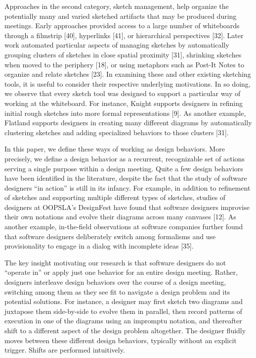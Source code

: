 Approaches in the second category, sketch management, help organize the potentially many and varied sketched artifacts that may be produced during meetings. Early approaches provided access to a large number of whiteboards through a filmstrip [40], hyperlinks [41], or hierarchical perspectives [32]. Later work automated particular aspects of managing sketches by automatically grouping clusters of sketches in close spatial proximity [31], shrinking sketches when moved to the periphery [18], or using metaphors such as Post-It Notes to organize and relate sketches [23].  
In examining these and other existing sketching tools, it is useful to consider their respective underlying motivations. In so doing, we observe that every sketch tool was designed to support a particular way of working at the whiteboard. For instance, Knight supports designers in refining initial rough sketches into more formal representations [9]. As another example, Flatland supports designers in creating many different diagrams by automatically clustering sketches and adding specialized behaviors to those clusters [31].

In this paper, we define these ways of working as design behaviors. More precisely, we define a design behavior as a recurrent, recognizable set of actions serving a single purpose within a design meeting. Quite a few design behaviors have been identified in the literature, despite the fact that the study of software designers “in action” is still in its infancy. For example, in addition to refinement of sketches and supporting multiple different types of sketches, studies of designers at OOPSLA’s DesignFest have found that software designers improvise their own notations and evolve their diagrams across many canvases [12]. As another example, in-the-field observations at software companies further found that software designers deliberately switch among formalisms and use provisionality to engage in a dialog with incomplete ideas [35]. 

The key insight motivating our research is that software designers do not “operate in” or apply just one behavior for an entire design meeting. Rather, designers interleave design behaviors over the course of a design meeting, switching among them as they see fit to navigate a design problem and its potential solutions. For instance, a designer may first sketch two diagrams and juxtapose them side-by-side to evolve them in parallel, then record patterns of execution in one of the diagrams using an impromptu notation, and thereafter shift to a different aspect of the design problem altogether. The designer fluidly moves between these different design behaviors, typically without an explicit trigger. Shifts are performed intuitively.


